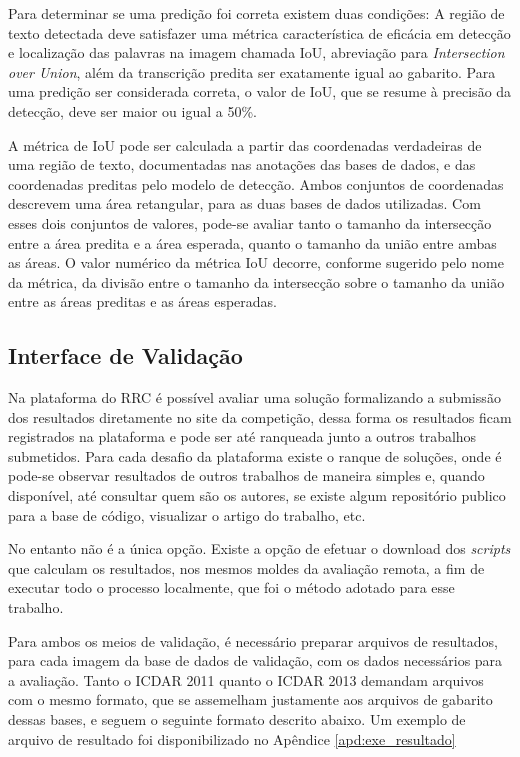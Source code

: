 Para determinar se uma predição foi correta existem duas condições: A região de texto detectada deve satisfazer uma métrica característica de eficácia em detecção e localização das palavras na imagem chamada IoU, abreviação para \textit{Intersection over Union}, além da transcrição predita ser exatamente igual ao gabarito. Para uma predição ser considerada correta, o valor de IoU, que se resume à precisão da detecção, deve ser maior ou igual a 50\%.

A métrica de IoU pode ser calculada a partir das coordenadas verdadeiras de uma região de texto, documentadas nas anotações das bases de dados, e das coordenadas preditas pelo modelo de detecção. Ambos conjuntos de coordenadas descrevem uma área retangular, para as duas bases de dados utilizadas. Com esses dois conjuntos de valores, pode-se avaliar tanto o tamanho da intersecção entre a área predita e a área esperada, quanto o tamanho da união entre ambas as áreas. O valor numérico da métrica IoU decorre, conforme sugerido pelo nome da métrica, da divisão entre o tamanho da intersecção sobre o tamanho da união entre as áreas preditas e as áreas esperadas.

\subsection{Interface de Validação}\label{sec:methodology_validation_interface}
Na plataforma do RRC é possível avaliar uma solução formalizando a submissão dos resultados diretamente no site da competição, dessa forma os resultados ficam registrados na plataforma e pode ser até ranqueada junto a outros trabalhos submetidos. Para cada desafio da plataforma existe o ranque de soluções, onde é pode-se observar resultados de outros trabalhos de maneira simples e, quando disponível, até consultar quem são os autores, se existe algum repositório publico para a base de código, visualizar o artigo do trabalho, etc.

No entanto não é a única opção. Existe a opção de efetuar o download dos \textit{scripts} que calculam os resultados, nos mesmos moldes da avaliação remota, a fim de executar todo o processo localmente, que foi o método adotado para esse trabalho.

Para ambos os meios de validação, é necessário preparar arquivos de resultados, para cada imagem da base de dados de validação, com os dados necessários para a avaliação. Tanto o ICDAR 2011 quanto o ICDAR 2013 demandam arquivos com o mesmo formato, que se assemelham justamente aos arquivos de gabarito dessas bases, e seguem o seguinte formato descrito abaixo. Um exemplo de arquivo de resultado foi disponibilizado no Apêndice \ref{apd:exe_resultado}

